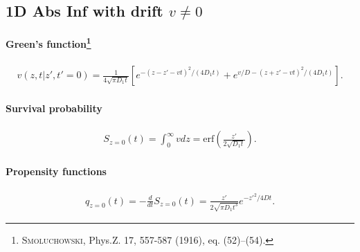 
\subsection{1D Abs Inf with drift $v\neq 0$}

\paragraph{Green's function\footnote{\textsc{Smoluchowski}, Phys.Z. 17, 557-587 (1916), eq. (52)--(54).}}
\begin{align}
  v(z,t|z',t'=0) = \frac{1}{4\sqrt{\pi D_1t}}
  \left[ e^{-(z-z'-vt)^2/(4 D_1 t)} + e^{v/D-(z+z'-vt)^2/(4 D_1 t)} \right].
\end{align}

\paragraph{Survival probability}
\begin{align}
  S_{z=0}(t) = \int_0^\infty v dz =
  \text{erf}(\frac{z'}{2\sqrt{D_1 t}}).
\end{align}

\paragraph{Propensity functions}
\begin{align}
  q_{z=0}(t) = -\frac{d}{dt} S_{z=0}(t)=
  \frac{z'}{2\sqrt{\pi D_1 t^3}} e^{-z'^2/4Dt}.
\end{align}

